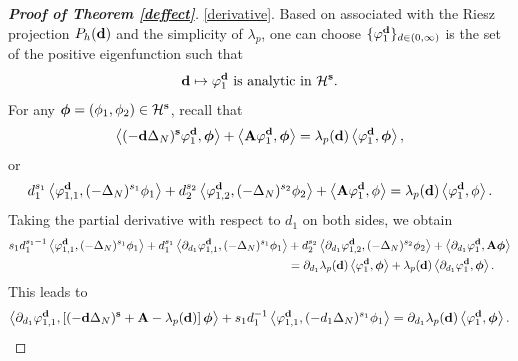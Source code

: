 \documentclass[a4paper,11pt]{amsart}
\theoremstyle{definition}
\numberwithin{equation}{section}
\theoremstyle{definition}
\begin{document}
\begin{proof} [\bf Proof of Theorem \ref{deffect}]

\ref{derivative}. Based on \cite[Chapter 2, Theorem 1.8]{kato_1976} associated with the Riesz projection $P_h({\bf d})$ and the simplicity of $\lambda_p$, one can choose $\{\varphi_1^{\bf d}\}_{d\in (0,\infty)}$ is the set of the positive eigenfunction such that
\begin{align*}
{\bf d}\mapsto \varphi_1^{\bf d} \text{ is analytic in }\mathcal{H}^{\bf s}.
\end{align*}
For any $\boldsymbol{\phi}=(\phi_1,\phi_2)\in \mathcal{H}^{\bf s}$, recall that
\begin{align*}
\left<(-\textbf{d}\Delta_N)^{\textbf{s}}\varphi _1^{\bf d},\boldsymbol{\phi}\right>+ \left<\textbf{A}\varphi_1^{\bf d},\boldsymbol{\phi}\right>=\lambda_p({\bf d})\left<\varphi_1^{\bf d},\boldsymbol{\phi}\right>,
\end{align*}
or
\begin{align*}
d^{s_1}_1\left<\varphi _{1,1}^{\bf d},(-\Delta_N)^{s_1}\phi_1\right>+d^{s_2}_2\left<\varphi_{1,2} ^{\bf d},(-\Delta_N)^{s_2}\phi_2\right>+ \left<\textbf{A}\varphi_1^{\bf d},\phi\right>=\lambda_p({\bf d})\left<\varphi_1^{\bf d},{\bf \phi}\right>.
\end{align*}
Taking the partial derivative with respect to $d_1$ on both sides, we obtain
\begin{align*}
s_1 d_1^{s_1-1}\left<\varphi _{1,1}^{\bf d},(-\Delta_N)^{s_1}\phi_1\right>+d_1^{s_1}\left<\partial_{d_1}\varphi _{1,1}^{\bf d},(-\Delta_N)^{s_1}\phi_1\right>&+d^{s_2}_2\left<\partial_{d_1}\varphi_{1,2} ^{\bf d},(-\Delta_N)^{s_2}\phi_2\right>+\left<\partial_{d_1}\varphi _1^{\bf d},\textbf{A}\boldsymbol{\phi}\right>\\
&=\partial_{d_1}\lambda_p({\bf d})\left<\varphi_1^{\bf d},\boldsymbol{\phi}\right>+\lambda_p({\bf d})\left<\partial_{d_1}\varphi_1^{\bf d},\boldsymbol{\phi}\right>.
\end{align*}
This leads to
\begin{align*}
\left<\partial_{d_1}\varphi _{1,1}^{\bf d},\left[(-\textbf{d}\Delta_N)^{\textbf{s}}+{\bf A}-\lambda_p({\bf d})\right]\boldsymbol{\phi}\right>+s_1 d_1^{-1} \left<\varphi _{1,1}^{\bf d},(-d_1\Delta_N)^{s_1}\phi_1\right>=\partial_{d_1}\lambda_p({\bf d})\left<\varphi_1^{\bf d},\boldsymbol{\phi}\right>.

\end{align*}
\end{proof}
\end{document}
